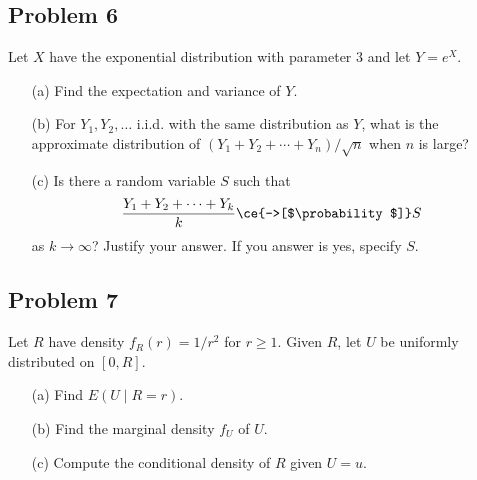 \subsection{Problem 6}
Let $X$ have the exponential distribution with parameter 3 and let $Y = e^X$.
\begin{enumerate}
    \item[(a)] Find the expectation and variance of $Y$.
    \item[(b)] For $Y_1, Y_2, \ldots$ i.i.d. with the same distribution as $Y$, what is the approximate distribution of $(Y_1 + Y_2 + \cdots + Y_n)/\sqrt{n}$ when $n$ is large?
    \item[(c)] Is there a random variable $S$ such that
    \begin{align}
        \frac{Y_1 + Y_2 + \cdots + Y_k}{k} \ce{->[$\probability$]} S
    \end{align}
    as $k \rightarrow \infty$? Justify your answer. If you answer is yes, specify $S$.
\end{enumerate}
\begin{solution}
    
\end{solution}

\subsection{Problem 7}
Let $R$ have density $f_R(r) = 1/r^2$ for $r \ge 1$. Given $R$, let $U$ be uniformly distributed on $[0,R]$.
\begin{enumerate}
    \item[(a)] Find $E(U \mid R = r)$.
    \item[(b)] Find the marginal density $f_U$ of $U$.
    \item[(c)] Compute the conditional density of $R$ given $U = u$.
\end{enumerate}
\begin{solution}
    
\end{solution}

